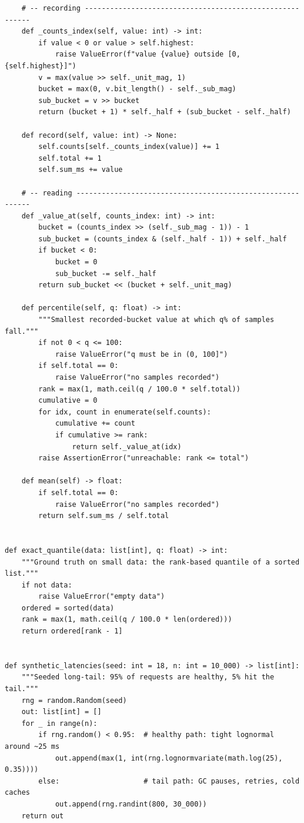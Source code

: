 \begin{verbatim}
    # -- recording ---------------------------------------------------------
    def _counts_index(self, value: int) -> int:
        if value < 0 or value > self.highest:
            raise ValueError(f"value {value} outside [0, {self.highest}]")
        v = max(value >> self._unit_mag, 1)
        bucket = max(0, v.bit_length() - self._sub_mag)
        sub_bucket = v >> bucket
        return (bucket + 1) * self._half + (sub_bucket - self._half)

    def record(self, value: int) -> None:
        self.counts[self._counts_index(value)] += 1
        self.total += 1
        self.sum_ms += value

    # -- reading -----------------------------------------------------------
    def _value_at(self, counts_index: int) -> int:
        bucket = (counts_index >> (self._sub_mag - 1)) - 1
        sub_bucket = (counts_index & (self._half - 1)) + self._half
        if bucket < 0:
            bucket = 0
            sub_bucket -= self._half
        return sub_bucket << (bucket + self._unit_mag)

    def percentile(self, q: float) -> int:
        """Smallest recorded-bucket value at which q% of samples fall."""
        if not 0 < q <= 100:
            raise ValueError("q must be in (0, 100]")
        if self.total == 0:
            raise ValueError("no samples recorded")
        rank = max(1, math.ceil(q / 100.0 * self.total))
        cumulative = 0
        for idx, count in enumerate(self.counts):
            cumulative += count
            if cumulative >= rank:
                return self._value_at(idx)
        raise AssertionError("unreachable: rank <= total")

    def mean(self) -> float:
        if self.total == 0:
            raise ValueError("no samples recorded")
        return self.sum_ms / self.total


def exact_quantile(data: list[int], q: float) -> int:
    """Ground truth on small data: the rank-based quantile of a sorted list."""
    if not data:
        raise ValueError("empty data")
    ordered = sorted(data)
    rank = max(1, math.ceil(q / 100.0 * len(ordered)))
    return ordered[rank - 1]


def synthetic_latencies(seed: int = 18, n: int = 10_000) -> list[int]:
    """Seeded long-tail: 95% of requests are healthy, 5% hit the tail."""
    rng = random.Random(seed)
    out: list[int] = []
    for _ in range(n):
        if rng.random() < 0.95:  # healthy path: tight lognormal around ~25 ms
            out.append(max(1, int(rng.lognormvariate(math.log(25), 0.35))))
        else:                    # tail path: GC pauses, retries, cold caches
            out.append(rng.randint(800, 30_000))
    return out



\end{verbatim}
